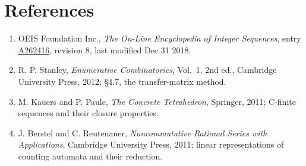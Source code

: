 \documentclass[11pt]{article}
\theoremstyle{definition}
\begin{document}
\section{References}

\begin{enumerate}

\item OEIS Foundation Inc., \emph{The On-Line Encyclopedia of Integer Sequences}, entry \href{https://oeis.org/A262416}{A262416}, revision 8, last modified Dec 31 2018.

\item R. P. Stanley, \emph{Enumerative Combinatorics}, Vol.~1, 2nd ed., Cambridge University Press, 2012; \S4.7, the transfer-matrix method.

\item M. Kauers and P. Paule, \emph{The Concrete Tetrahedron}, Springer, 2011; C-finite sequences and their closure properties.

\item J. Berstel and C. Reutenauer, \emph{Noncommutative Rational Series with Applications}, Cambridge University Press, 2011; linear representations of counting automata and their reduction.

\end{enumerate}
\end{document}

